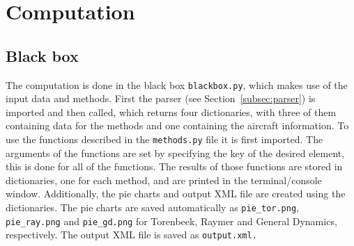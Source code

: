 \section{Computation}
\label{sec:comp}

\subsection{Black box}
\label{subsec:blackbox}
The computation is done in the black box \texttt{blackbox.py}, which makes use of the input data and methods.
First the parser (see Section~\ref{subsec:parser}) is imported and then  called, which returns four dictionaries, with three of them containing data for the methods and one containing the aircraft information.
To use the functions described in the \texttt{methods.py} file it is first imported.
The arguments of the functions are set by specifying the key of the desired element, this is done for all of the functions.
The results of those functions are stored in dictionaries, one for each method, and are printed in the terminal/console window.
Additionally, the pie charts and output XML file are created using the dictionaries.
The pie charts are saved automatically as \texttt{pie\_tor.png}, \texttt{pie\_ray.png} and \texttt{pie\_gd.png} for Torenbeek, Raymer and General Dynamics, respectively.
The output XML file is saved as \texttt{output.xml.}



